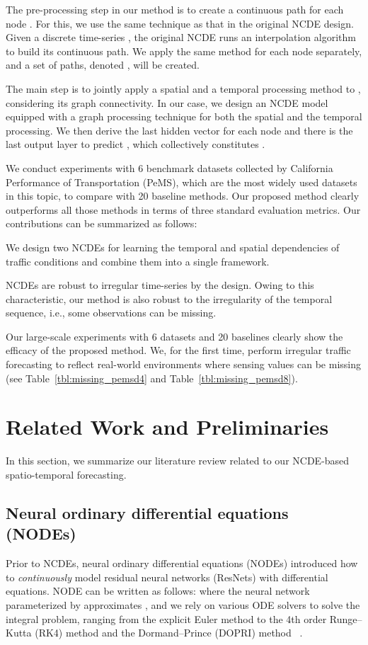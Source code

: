 \documentclass[letterpaper]{article} \usepackage{aaai22}  \usepackage{times}  \usepackage{helvet}  \usepackage{courier}  \usepackage[hyphens]{url}  \usepackage{graphicx} \urlstyle{rm} \def\UrlFont{\rm}  \usepackage{natbib}  \usepackage{caption} \DeclareCaptionStyle{ruled}{labelfont=normalfont,labelsep=colon,strut=off} \frenchspacing  \setlength{\pdfpagewidth}{8.5in}  \setlength{\pdfpageheight}{11in}  \usepackage{stfloats}
\begin{document}
The pre-processing step in our method is to create a continuous path  for each node . For this, we use the same technique as that in the original NCDE design. Given a discrete time-series , the original NCDE runs an interpolation algorithm to build its continuous path. We apply the same method for each node separately, and a set of paths, denoted , will be created.

The main step is to jointly apply a spatial and a temporal processing method to , considering its graph connectivity. In our case, we design an NCDE model equipped with a graph processing technique for both the spatial and the temporal processing. We then derive the last hidden vector  for each node  and there is the last output layer to predict , which collectively constitutes .

We conduct experiments with 6 benchmark datasets collected by California Performance of Transportation (PeMS), which are the most widely used datasets in this topic, to compare with 20 baseline methods. Our proposed method clearly outperforms all those methods in terms of three standard evaluation metrics. Our contributions can be summarized as follows:
\begin{compactenum}
    \item We design two NCDEs for learning the temporal and spatial dependencies of traffic conditions and combine them into a single framework.
    \item NCDEs are robust to irregular time-series by the design. Owing to this characteristic, our method is also robust to the irregularity of the temporal sequence, i.e., some observations can be missing. 
    \item Our large-scale experiments with 6 datasets and 20 baselines clearly show the efficacy of the proposed method. We, for the first time, perform irregular traffic forecasting to reflect real-world environments where sensing values can be missing (see Table~\ref{tbl:missing_pemsd4} and Table~\ref{tbl:missing_pemsd8}).
\end{compactenum}

\section{Related Work and Preliminaries}
In this section, we summarize our literature review related to our NCDE-based spatio-temporal forecasting.
\subsection{Neural ordinary differential equations (NODEs)}
Prior to NCDEs, neural ordinary differential equations (NODEs) introduced how to \emph{continuously} model residual neural networks (ResNets) with differential equations. NODE can be written as follows:
where the neural network parameterized by  approximates , and we rely on various ODE solvers to solve the integral problem, ranging from the explicit Euler method to the 4th order Runge--Kutta (RK4) method and the Dormand--Prince (DOPRI) method ~\cite{DORMAND198019}.
\end{document}
